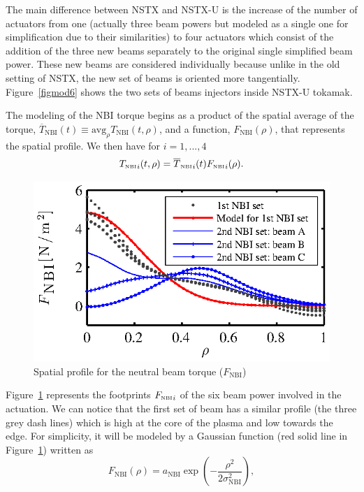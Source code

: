 \documentclass[12pt,lot, lof]{puthesis}
\begin{document}
The main difference between NSTX and NSTX-U is the increase of the number of actuators from one (actually three beam powers but modeled as a single one for simplification due to their similarities) to four actuators which consist of the addition of the three new beams separately to the original single simplified beam power. These new beams are considered individually because unlike in the old setting of NSTX, the new set of beams is oriented more tangentially. Figure~{\ref{figmod6}} shows the two sets of beams injectors inside NSTX-U tokamak.

The modeling of the NBI torque begins as a product of the spatial average of the torque, $\overline{T}_\text{NBI}(t) \equiv \text{avg}_\rho T_\text{NBI}(t,\rho)$, and a function, $F_\text{NBI}(\rho)$, that represents the spatial profile.
We then have for $i=1,...,4$  
\begin{equation}
{T_\textrm{\tiny{NBI}}}_i(t,\rho) = {\overline{T}_\textrm{\tiny{NBI}}}_i(t) {F_\textrm{\tiny{NBI}}}_i(\rho).
\label{model5}
\end{equation}

\begin{figure} 
\centering
\includegraphics [width=0.7 \linewidth]{chap10/fig4} 
\caption{Spatial profile for the neutral beam torque ($F_\text{NBI} $) }
\label{figmod5}
\end{figure} 
Figure~{\ref{figmod5}} represents the footprints ${F_\textrm{\tiny{NBI}}}_i$ of the six beam power involved in the actuation. We can notice that the first set of beam has a similar profile (the three grey dash lines) which is high at the core of the plasma and low towards the edge. For simplicity, it will be modeled by a Gaussian function (red solid line in Figure~{\ref{figmod5}}) written as
\begin{equation}
F_\text{NBI}(\rho) = a_\text{NBI} \exp\left( - \frac{\rho^2}{2\sigma^2_\text{NBI}}\right),
\label{model6}
\end{equation}    
\end{document}
